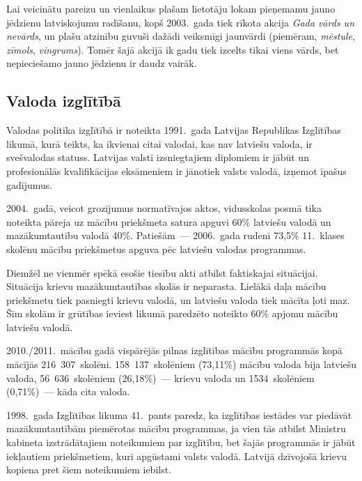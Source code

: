 \begin{multicols}{2}
Lai veicinātu pareizu un vienlaikus plašam lietotāju lokam pieņemamu jauno jēdzienu latviskojumu radīšanu, kopš 2003.~gada tiek rīkota akcija \textit{Gada vārds un nevārds}, un plašu atzinību guvuši dažādi veiksmīgi jaunvārdi (piemēram, \textit{mēstule}, \textit{zīmols}, \textit{vingrums}). 
Tomēr šajā akcijā ik gadu tiek izcelts tikai viens vārds, bet nepieciešamo jauno jēdzienu ir daudz vairāk.

\subsection{Valoda izglītībā}

Valodas politika izglītībā ir noteikta 1991.~gada Latvijas Republikas Izglītības likumā, kurā teikts, ka ikvienai citai valodai, kas nav latviešu valoda, ir svešvalodas statuss.
Latvijas valstī izsniegtajiem diplomiem ir jābūt un profesionālās kvalifikācijas eksāmeniem ir jānotiek valsts valodā, izņemot īpašus gadījumus. 


2004.~gadā, veicot grozījumus normatīvajos aktos, vidusskolas posmā tika noteikta pāreja uz mācību priekšmeta satura apguvi 60\% latviešu valodā un mazākumtautību valodā 40\%. 
Patiešām~--- 2006.~gada rudenī 73,5\% 11.~klases skolēnu mācību priekšmetus apguva pēc latviešu valodas programmas.

Diemžēl ne vienmēr spēkā esošie tiesību akti atbilst faktiskajai situācijai.
Situācija krievu mazākumtautības skolās ir neparasta.
Lielākā daļa mācību priekšmetu tiek pasniegti krievu valodā, un latviešu valoda tiek mācīta ļoti maz.
Šīm skolām ir grūtības ieviest likumā paredzēto noteikto 60\% apjomu mācību latviešu valodā.

2010./2011.~mācību gadā vispārējās pilnas izglītības mācību programmās kopā mācījās 216~307~skolēni.
158~137~skolēniem (73,11\%) mācību valoda bija latviešu valoda, 56~636~skolēniem (26,18\%)~--- krievu valoda un 1534~skolēniem (0,71\%)~--- kāda cita valoda.

1998.~gada Izglītības likuma 41.~pants paredz, ka izglītības iestādes var piedāvāt mazākumtautībām piemērotas mācību programmas, ja vien tās atbilst Ministru kabineta izstrādātajiem noteikumiem par izglītību, bet šajās programmās ir jābūt iekļautiem priekšmetiem, kuri apgūstami valsts valodā.
Latvijā dzīvojošā krievu kopiena pret šiem noteikumiem iebilst.


\end{multicols}
